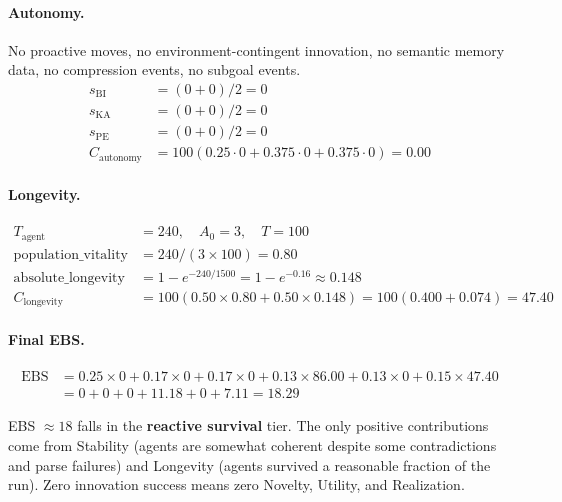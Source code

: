 \documentclass[a4paper, 11pt]{article}
\newcommand{\ebs}{\text{EBS}}
\begin{document}
\paragraph{Autonomy.} No proactive moves, no environment-contingent innovation, no semantic memory data, no compression events, no subgoal events.
\begin{align*}
    s_{\text{BI}} &= (0 + 0)/2 = 0 \\
    s_{\text{KA}} &= (0 + 0)/2 = 0 \\
    s_{\text{PE}} &= (0 + 0)/2 = 0 \\
    C_{\text{autonomy}} &= 100(0.25 \cdot 0 + 0.375 \cdot 0 + 0.375 \cdot 0) = \mathbf{0.00}
\end{align*}

\paragraph{Longevity.}
\begin{align*}
    T_{\text{agent}} &= 240, \quad A_0 = 3, \quad T = 100 \\
    \text{population\_vitality} &= 240 / (3 \times 100) = 0.80 \\
    \text{absolute\_longevity} &= 1 - e^{-240/1500} = 1 - e^{-0.16} \approx 0.148 \\
    C_{\text{longevity}} &= 100(0.50 \times 0.80 + 0.50 \times 0.148) = 100(0.400 + 0.074) = \mathbf{47.40}
\end{align*}

\paragraph{Final EBS.}
\begin{align*}
    \ebs &= 0.25 \times 0 + 0.17 \times 0 + 0.17 \times 0 + 0.13 \times 86.00 + 0.13 \times 0 + 0.15 \times 47.40 \\
    &= 0 + 0 + 0 + 11.18 + 0 + 7.11 = \boxed{18.29}
\end{align*}

\begin{interpretbox}
    EBS $\approx 18$ falls in the \textbf{reactive survival} tier. The only positive contributions come from Stability (agents are somewhat coherent despite some contradictions and parse failures) and Longevity (agents survived a reasonable fraction of the run). Zero innovation success means zero Novelty, Utility, and Realization.
\end{interpretbox}

\end{document}
